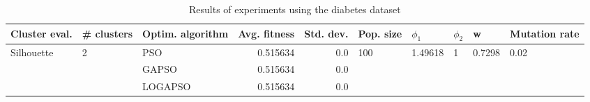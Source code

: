 \begin{table}
\centering
\caption{Results of experiments using the diabetes dataset}
\begin{tabular}{lllrrlllll}
\toprule
              Cluster eval. &        \# clusters & Optim. algorithm &  Avg. fitness &  Std. dev. &            Pop. size &               $\phi_{1}$ &         $\phi_{2}$ &                       w &         Mutation rate \\
\midrule
\multirow{3}{*}{Silhouette} & \multirow{3}{*}{2} &              PSO &      0.515634 &        0.0 & \multirow{3}{*}{100} & \multirow{3}{*}{1.49618} & \multirow{3}{*}{1} & \multirow{3}{*}{0.7298} & \multirow{3}{*}{0.02} \\
                            &                    &            GAPSO &      0.515634 &        0.0 &                      &                          &                    &                         &                       \\
                            &                    &          LOGAPSO &      0.515634 &        0.0 &                      &                          &                    &                         &                       \\
\bottomrule
\end{tabular}
\end{table}

